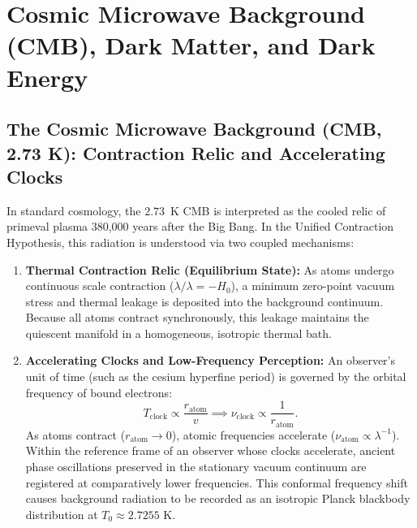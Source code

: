 \section{Cosmic Microwave Background (CMB), Dark Matter, and Dark Energy}
\label{sec:cmb_karanlik_madde}

\subsection{The Cosmic Microwave Background (CMB, 2.73 K): Contraction Relic and Accelerating Clocks}
In standard cosmology, the $2.73$~K CMB is interpreted as the cooled relic of primeval plasma 380,000 years after the Big Bang. In the Unified Contraction Hypothesis, this radiation is understood via two coupled mechanisms:

\begin{enumerate}
    \item \textbf{Thermal Contraction Relic (Equilibrium State):}
          As atoms undergo continuous scale contraction ($\dot{\lambda}/\lambda = -H_0$), a minimum zero-point vacuum stress and thermal leakage is deposited into the background continuum. Because all atoms contract synchronously, this leakage maintains the quiescent manifold in a homogeneous, isotropic thermal bath.

    \item \textbf{Accelerating Clocks and Low-Frequency Perception:}
          An observer's unit of time (such as the cesium hyperfine period) is governed by the orbital frequency of bound electrons:
          \begin{equation}
              T_{\mathrm{clock}} \propto \frac{r_{\mathrm{atom}}}{v} \implies \nu_{\mathrm{clock}} \propto \frac{1}{r_{\mathrm{atom}}}.
              \label{eq:hizlanan_saat}
          \end{equation}
          As atoms contract ($r_{\mathrm{atom}} \to 0$), atomic frequencies accelerate ($\nu_{\mathrm{atom}} \propto \lambda^{-1}$). Within the reference frame of an observer whose clocks accelerate, ancient phase oscillations preserved in the stationary vacuum continuum are registered at comparatively lower frequencies. This conformal frequency shift causes background radiation to be recorded as an isotropic Planck blackbody distribution at $T_0 \approx 2.7255\text{ K}$.


\end{enumerate}
